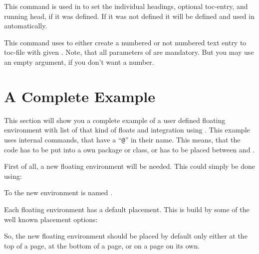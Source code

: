 \begin{Declaration}
\end{Declaration}
%
This command
is used in  to set the individual headings, optional
toc-entry, and running head, if it was defined. If it was not defined it will
be defined and used in  automatically.
%

\begin{Declaration}
\end{Declaration}
%
This command
uses  to either create a numbered or not numbered text
entry to toc-file with given . Note, that all parameters of
 are mandatory. But you may use an
empty  argument, if you don't want a number.

\section{A Complete Example}
\label{sec:tocbasic.example}

This section will show you a complete example of a user defined floating
environment with list of that kind of floats and \KOMAScript{} integration
using . This example uses internal commands, that have a
``\texttt{@}'' in their name. This means, that the code
has to be put into a own package or class, or has to be placed between
%
 and .

First of all, a new floating environment will be
needed. This could simply be done using:
\begin{lstcode}[belowskip=\dp\strutbox plus 1pt]
  \newenvironment{remarkbox}{%
    \@float{remarkbox}%
  }{%
    \end@float
  }
\end{lstcode}
To the new environment is named .

Each floating environment has a default
placement. This is build by some of the well known placement options:
\begin{lstcode}[belowskip=\dp\strutbox plus 1pt]
  \newcommand*{\fps@remarkbox}{tbp}
\end{lstcode}
So, the new floating environment should be placed by default only either at
the top of a page, at the bottom of a page, or on a page on its own.

